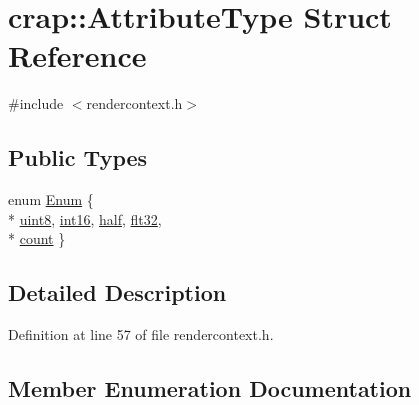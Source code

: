 \hypertarget{structcrap_1_1_attribute_type}{}\section{crap\+:\+:Attribute\+Type Struct Reference}
\label{structcrap_1_1_attribute_type}


{\ttfamily \#include $<$rendercontext.\+h$>$}

\subsection*{Public Types}
\begin{DoxyCompactItemize}
\item 
enum \hyperlink{structcrap_1_1_attribute_type_a5f73679cb4743fa93308c733fcc45cc2}{Enum} \{ \\*
\hyperlink{structcrap_1_1_attribute_type_a5f73679cb4743fa93308c733fcc45cc2ae6630b7742d885f5be07231874ed050d}{uint8}, 
\hyperlink{structcrap_1_1_attribute_type_a5f73679cb4743fa93308c733fcc45cc2a1400e783895ab905f5a0844c9b27157a}{int16}, 
\hyperlink{structcrap_1_1_attribute_type_a5f73679cb4743fa93308c733fcc45cc2aa965fde06edf206a0d7742ac36b67a79}{half}, 
\hyperlink{structcrap_1_1_attribute_type_a5f73679cb4743fa93308c733fcc45cc2adb0caf586bca4a288a0ac098d4720c52}{flt32}, 
\\*
\hyperlink{structcrap_1_1_attribute_type_a5f73679cb4743fa93308c733fcc45cc2aedac4d118b121168c4340ca805f62598}{count}
 \}
\end{DoxyCompactItemize}


\subsection{Detailed Description}


Definition at line 57 of file rendercontext.\+h.



\subsection{Member Enumeration Documentation}
\hypertarget{structcrap_1_1_attribute_type_a5f73679cb4743fa93308c733fcc45cc2}{}
